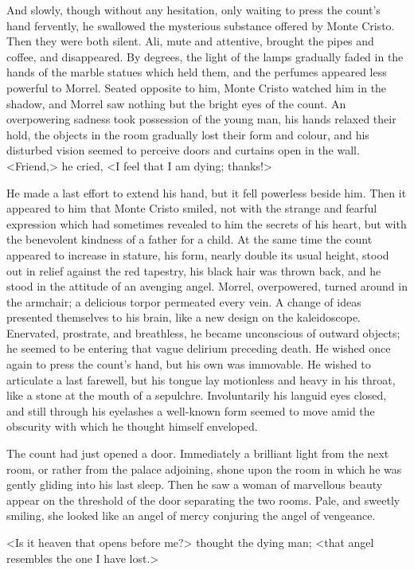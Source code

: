  And slowly, though without any hesitation, only waiting to press the count's hand fervently, he swallowed the mysterious substance offered by Monte Cristo. Then they were both silent. Ali, mute and attentive, brought the pipes and coffee, and disappeared. By degrees, the light of the lamps gradually faded in the hands of the marble statues which held them, and the perfumes appeared less powerful to Morrel. Seated opposite to him, Monte Cristo watched him in the shadow, and Morrel saw nothing but the bright eyes of the count. An overpowering sadness took possession of the young man, his hands relaxed their hold, the objects in the room gradually lost their form and colour, and his disturbed vision seemed to perceive doors and curtains open in the wall.  <Friend,> he cried, <I feel that I am dying; thanks!> 

 He made a last effort to extend his hand, but it fell powerless beside him. Then it appeared to him that Monte Cristo smiled, not with the strange and fearful expression which had sometimes revealed to him the secrets of his heart, but with the benevolent kindness of a father for a child. At the same time the count appeared to increase in stature, his form, nearly double its usual height, stood out in relief against the red tapestry, his black hair was thrown back, and he stood in the attitude of an avenging angel. Morrel, overpowered, turned around in the armchair; a delicious torpor permeated every vein. A change of ideas presented themselves to his brain, like a new design on the kaleidoscope. Enervated, prostrate, and breathless, he became unconscious of outward objects; he seemed to be entering that vague delirium preceding death. He wished once again to press the count's hand, but his own was immovable. He wished to articulate a last farewell, but his tongue lay motionless and heavy in his throat, like a stone at the mouth of a sepulchre. Involuntarily his languid eyes closed, and still through his eyelashes a well-known form seemed to move amid the obscurity with which he thought himself enveloped. 

 The count had just opened a door. Immediately a brilliant light from the next room, or rather from the palace adjoining, shone upon the room in which he was gently gliding into his last sleep. Then he saw a woman of marvellous beauty appear on the threshold of the door separating the two rooms. Pale, and sweetly smiling, she looked like an angel of mercy conjuring the angel of vengeance. 

 <Is it heaven that opens before me?> thought the dying man; <that angel resembles the one I have lost.> 

